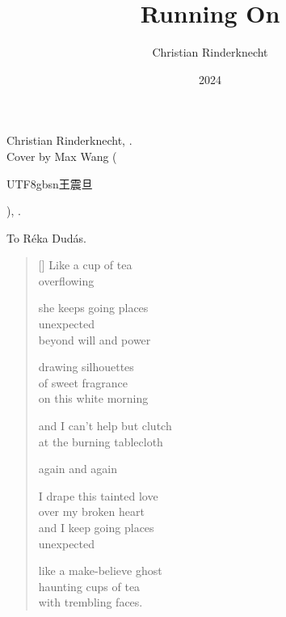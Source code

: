 \documentclass[14pt]{extbook}
\title{Running On}
\author{Christian Rinderknecht}
\date{\small 2024}
\newcommand*{\centeredornament}{\centerline{\pgfornament[width=6cm]{88}}}
\newcommand{\zh}[1]{\begin{CJK}{UTF8}{gbsn}#1\end{CJK}}
\begin{document}


\thispagestyle{empty}

\mbox{}
\thispagestyle{empty}

\newpage

\thispagestyle{empty}

\maketitle

\thispagestyle{empty}

\vspace*{14cm}

\begin{flushright}
  \textcopyright{} Christian Rinderknecht, .\\
  \textcopyright{} Cover by Max Wang (\zh{王震旦}), .
\end{flushright}

\newpage

\vspace*{4cm}

\begin{flushright}
To Réka Dudás.
\end{flushright}

\thispagestyle{empty}

\newpage\leavevmode\thispagestyle{empty}\newpage



\newpage

\vspace*{-15mm}
\centeredornament
\vspace*{-7mm}


\settowidth{\versewidth}{Like a make-believe ghost}

\begin{verse}[\versewidth]
  Like a cup of tea \\
  overflowing

  she keeps going places \\
  unexpected \\
  beyond will and power

  drawing silhouettes \\
  of sweet fragrance \\
  on this white morning

  and I can't help but clutch \\
  at the burning tablecloth

  again and again

  I drape this tainted love \\
  over my broken heart \\
  and I keep going places \\
  unexpected

  like a make-believe ghost \\
  haunting cups of tea \\
  with trembling faces.
\end{verse}
\end{document}
